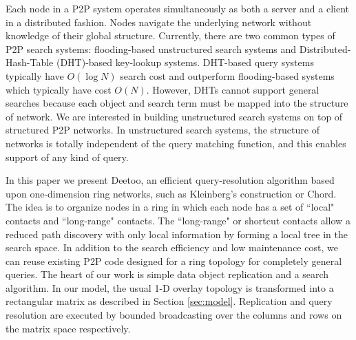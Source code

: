 \documentclass[9.5pt,journal,final,finalsubmission,twocolumn]{IEEEtran}
\begin{document}
Each node in a P2P system operates simultaneously as both a server and a client
in a distributed fashion. Nodes navigate the
underlying network without knowledge of their global structure. 
Currently, there are two common types of P2P search systems: flooding-based
unstructured search systems and Distributed-Hash-Table (DHT)-based key-lookup systems. 
DHT-based query systems typically have $O(\log N)$ search cost and outperform 
flooding-based systems which typically have cost $O(N)$.
However, DHTs cannot support general searches because each object
and search term must be mapped into the structure of network.
We are interested in building unstructured search systems on top of 
structured P2P networks. In unstructured search systems, 
the structure of networks is totally independent of the query matching 
function, and this enables support of any kind of query.  

In this paper we present Deetoo, an efficient query-resolution 
algorithm based upon one-dimension ring networks,
such as Kleinberg's construction
\cite{jk:Algorithmic} or Chord\cite{is:Chord}.
The idea is to organize nodes in a ring in which 
each node has a set of ``local" contacts and ``long-range" 
contacts. 
The ``long-range" or shortcut contacts allow a reduced path discovery 
with only local information by forming a local tree in the search space. 
In addition to the search efficiency and low maintenance cost, 
we can reuse existing P2P code designed for a ring topology for completely
general queries.
The heart of our work is simple data object replication and a search 
algorithm. In our model, the usual 1-D
overlay topology is transformed into a rectangular 
matrix as described in Section \ref{sec:model}.  Replication and 
query resolution are executed by bounded broadcasting over the 
columns and rows on the matrix space respectively.
\end{document}
